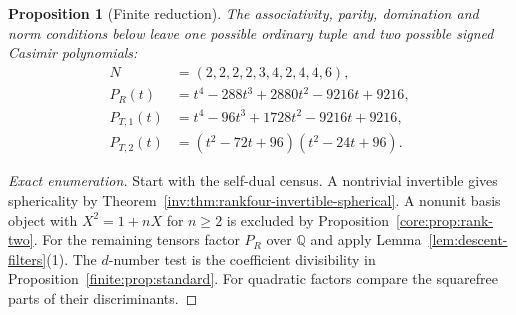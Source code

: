 \documentclass[11pt,a4paper]{article}
\newtheorem{proposition}[theorem]{Proposition}
\theoremstyle{definition}\newtheorem{definition}[theorem]{Definition}
\theoremstyle{remark}\newtheorem{remark}[theorem]{Remark}
\newcommand{\Q}{\mathbb Q}
\numberwithin{equation}{section}
\begin{document}
\begin{proposition}[Finite reduction]\label{prop:two-polys}
The associativity, parity, domination and norm conditions below leave
one possible ordinary tuple and two possible signed Casimir polynomials:
\[
\begin{aligned}
 N&=(2,2,2,2,3,4,2,4,4,6),\\
 P_R(t)&=t^4-288t^3+2880t^2-9216t+9216,\\
 P_{T,1}(t)&=t^4-96t^3+1728t^2-9216t+9216,\\
 P_{T,2}(t)&=(t^2-72t+96)(t^2-24t+96).
\end{aligned}
\]
\end{proposition}
\begin{proof}[Exact enumeration]
Start with the self-dual census. A nontrivial invertible gives sphericality
by Theorem~\ref{inv:thm:rankfour-invertible-spherical}. A nonunit
basis object with $X^2=1+nX$ for $n\ge2$ is excluded by
Proposition~\ref{core:prop:rank-two}. For the remaining tensors factor $P_R$
over $\Q$ and apply Lemma~\ref{lem:descent-filters}(1). The $d$-number
test is the coefficient divisibility in Proposition~\ref{finite:prop:standard}.
For quadratic factors compare the squarefree parts of their discriminants.


\end{proof}
\end{document}
